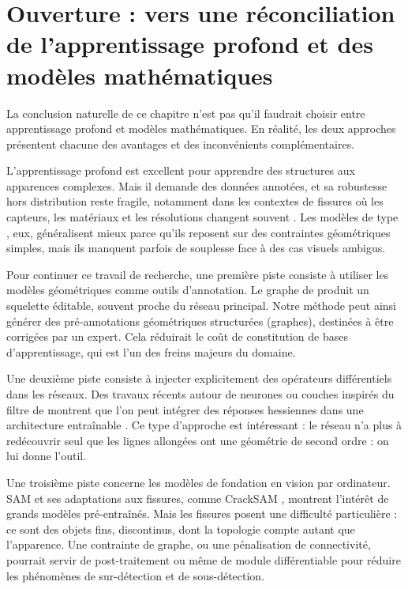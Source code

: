 \section{Ouverture : vers une réconciliation de l'apprentissage profond et des modèles mathématiques}
\label{sec:chapIII_ouverture_dl_modeles}

La conclusion naturelle de ce chapitre n'est pas qu'il faudrait choisir entre apprentissage profond et modèles mathématiques. En réalité, les deux approches présentent chacune des avantages et des inconvénients complémentaires.

L'apprentissage profond est excellent pour apprendre des structures aux apparences complexes. Mais il demande des données annotées, et sa robustesse hors distribution reste fragile, notamment dans les contextes de fissures où les capteurs, les matériaux et les résolutions changent souvent \cite{Zhang2025Review}. Les modèles de type \Frangi{}, eux, généralisent mieux parce qu'ils reposent sur des contraintes géométriques simples, mais ils manquent parfois de souplesse face à des cas visuels ambigus.

Pour continuer ce travail de recherche, une première piste consiste à utiliser les modèles géométriques comme outils d'annotation. Le graphe de \Frangi{} produit un squelette éditable, souvent proche du réseau principal. Notre méthode peut ainsi générer des pré-annotations géométriques structurées (graphes), destinées à être corrigées par un expert. Cela réduirait le coût de constitution de bases d'apprentissage, qui est l'un des freins majeurs du domaine.

Une deuxième piste consiste à injecter explicitement des opérateurs différentiels dans les réseaux. Des travaux récents autour de neurones ou couches inspirés du filtre de \Frangi{} montrent que l'on peut intégrer des réponses hessiennes dans une architecture entraînable \cite{NeuroneFrangi2023}. Ce type d'approche est intéressant : le réseau n'a plus à redécouvrir seul que les lignes allongées ont une géométrie de second ordre : on lui donne l'outil.

Une troisième piste concerne les modèles de fondation en vision par ordinateur. SAM \cite{Kirillov2023SAM} et ses adaptations aux fissures, comme CrackSAM \cite{Ge2024CrackSAM}, montrent l'intérêt de grands modèles pré-entraînés. Mais les fissures posent une difficulté particulière : ce sont des objets fins, discontinus, dont la topologie compte autant que l'apparence. Une contrainte de graphe, ou une pénalisation de connectivité, pourrait servir de post-traitement ou même de module différentiable pour réduire les phénomènes de sur-détection et de sous-détection.


